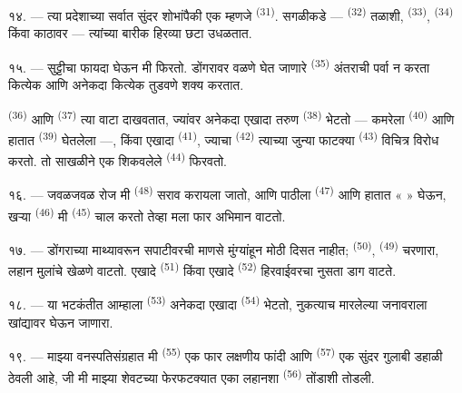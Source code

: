 १४. --- त्या प्रदेशाच्या सर्वात सुंदर शोभांपैकी एक म्हणजे 
\textsuperscript{(31)}. सगळीकडे —  \textsuperscript{(32)} तळाशी,
 \textsuperscript{(33)}, 
\textsuperscript{(34)} किंवा  काठावर — त्यांच्या बारीक  हिरव्या
छटा उधळतात.

\VUsaut{3.0mm}
\VUsaut{3.0mm}

१५. --- सुट्टीचा फायदा घेऊन मी  फिरतो. डोंगरावर वळणे घेत जाणारे 
\textsuperscript{(35)} अंतराची पर्वा न करता कित्येक  आणि अनेकदा कित्येक
 तुडवणे शक्य करतात.

 \textsuperscript{(36)} आणि  \textsuperscript{(37)} त्या वाटा दाखवतात, ज्यांवर अनेकदा एखादा तरुण  \textsuperscript{(38)} भेटतो — कमरेला  \textsuperscript{(40)} आणि हातात  \textsuperscript{(39)} घेतलेला —, किंवा एखादा  \textsuperscript{(41)}, ज्याचा  \textsuperscript{(42)} त्याच्या जुन्या फाटक्या  \textsuperscript{(43)} विचित्र विरोध करतो. तो साखळीने एक शिकवलेले  \textsuperscript{(44)} फिरवतो.

\VUsaut{3.0mm}

१६. --- जवळजवळ रोज मी  \textsuperscript{(48)}  सराव
करायला जातो, आणि पाठीला  \textsuperscript{(47)} आणि हातात « 
» घेऊन, खऱ्या  \textsuperscript{(46)} मी 
\textsuperscript{(45)} चाल करतो तेव्हा मला फार अभिमान वाटतो.

१७. --- डोंगराच्या माथ्यावरून सपाटीवरची माणसे मुंग्यांहून मोठी दिसत नाहीत;
 \textsuperscript{(50)},  \textsuperscript{(49)} चरणारा,
लहान मुलांचे खेळणे वाटतो. एखादे  \textsuperscript{(51)} किंवा एखादे
 \textsuperscript{(52)} हिरवाईवरचा नुसता डाग वाटते.

१८. --- या भटकंतीत आम्हाला  \textsuperscript{(53)} अनेकदा एखादा
 \textsuperscript{(54)} भेटतो, नुकत्याच मारलेल्या जनावराला
खांद्यावर घेऊन जाणारा.

१९. --- माझ्या वनस्पतिसंग्रहात मी  \textsuperscript{(55)} एक फार लक्षणीय
फांदी आणि  \textsuperscript{(57)} एक सुंदर गुलाबी डहाळी ठेवली आहे, जी मी माझ्या
शेवटच्या फेरफटक्यात एका लहानशा  \textsuperscript{(56)} तोंडाशी तोडली.


